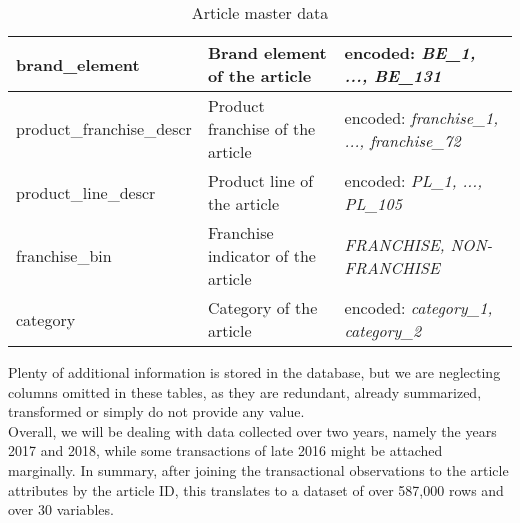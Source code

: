 \begin{table}[H]
\begin{adjustbox}{max width=\textwidth}
\begin{tabular}{|l|l|l|}
brand\_element            & Brand element of the article                           & encoded: \textit{BE\_1, ..., BE\_131 }                   \\ \hline
product\_franchise\_descr & Product franchise of the article                       & encoded: \textit{franchise\_1, ..., franchise\_72}     \\ \hline
product\_line\_descr      & Product line of the article                            & encoded: \textit{PL\_1, ..., PL\_105 }                 \\ \hline
franchise\_bin            & Franchise indicator of the article                     &\textit{ FRANCHISE, NON-FRANCHISE }                     \\ \hline
category                  & Category of the article                                & encoded: \textit{category\_1, category\_2}             \\ \hline
\end{tabular}
\end{adjustbox}
\caption{Article master data}
\label{tab:article_master_data}
\end{table}

Plenty of additional information is stored in the database, but we are neglecting columns omitted in these tables, as they are redundant, already summarized, transformed or simply do not provide any value.\\
Overall, we will be dealing with data collected over two years, namely the years 2017 and 2018, while some transactions of late 2016 might be attached marginally. In summary, after joining the transactional observations to the article attributes by the article ID, this translates to a dataset of over 587,000 rows and over 30 variables. 

